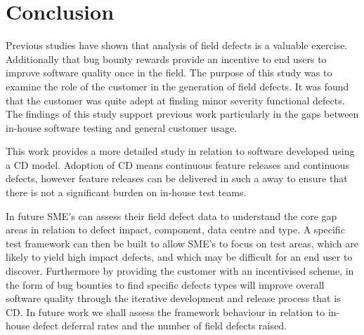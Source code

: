 \documentclass[conference]{IEEEtran}
\begin{document}
\vspace{-1mm}
\section{Conclusion}
Previous studies have shown that analysis of field defects is a valuable exercise. Additionally that bug bounty rewards provide an incentive to end users to improve software quality once in the field. The purpose of this study was to examine the role of the customer in the generation of field defects. It was found that the customer was quite adept at finding minor severity functional defects.  The findings of this study support previous work particularly in the gaps between in-house software testing and general customer usage. \par
This work provides a more detailed study in relation to software developed using a CD model. Adoption of CD means continuous feature releases and continuous defects, however feature releases can be delivered in such a away to ensure that there is not a significant burden on in-house test teams.  \par
 In future SME's can assess their field defect data to understand the core gap areas in relation to defect impact, component, data centre and type. A specific test framework can then be built to allow SME's to focus on test areas, which are likely to yield high impact defects, and which may be difficult for an end user to discover. 
Furthermore by providing the customer with an incentivised scheme, in the form of bug bounties to find specific defects types will improve overall software quality through the iterative development and release process that is CD. 
In future work we shall assess the framework behaviour in relation to in-house defect deferral rates and the number of field defects raised.
%
%
\end{document}
